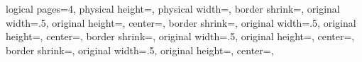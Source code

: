 %
%
%
%
%
%
%
%
{%
	\edef\pgfpageoptionheight{\the\paperheight}%
	\edef\pgfpageoptionwidth{\the\paperwidth}%
	\edef\pgfpageoptionborder{1pt}%
}%
{
  \pgfpagesphysicalpageoptions%
  {%
    logical pages=4,%
    physical height=\pgfpageoptionheight,%
    physical width=\pgfpageoptionwidth,%
  }%
%
%
  {%
    border shrink=\pgfpageoptionborder,%
    original width=.5\pgfpageoptionheight,%
    original height=\pgfpageoptionwidth,%
	center=\pgfpoint{0\pgfphysicalwidth}{.625\pgfphysicalheight},%
  }%
  {%
    border shrink=\pgfpageoptionborder,%
    original width=.5\pgfpageoptionheight,%
    original height=\pgfpageoptionwidth,%
	center=\pgfpoint{0\pgfphysicalwidth}{.125\pgfphysicalheight},%
  }%
%
%
  {%
	border shrink=\pgfpageoptionborder,%
	original width=.5\pgfpageoptionheight,%
	original height=\pgfpageoptionwidth,%
	center=\pgfpoint{0\pgfphysicalwidth}{.625\pgfphysicalheight},%
  }%
  {%
	border shrink=\pgfpageoptionborder,%
	original width=.5\pgfpageoptionheight,%
	original height=\pgfpageoptionwidth,%
	center=\pgfpoint{0pt}{.125\pgfphysicalheight},%
	}%
}%